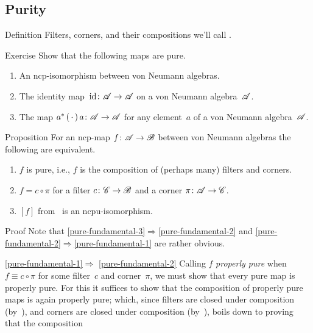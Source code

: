 \documentclass[a]{subfiles}
\begin{document}
\subsection{Purity}
\begin{parsec}%
\begin{point}[pure]{Definition}%
Filters, corners,
and their compositions we'll call .
\end{point}
\begin{point}{Exercise}%
Show that the following maps are pure.
\begin{enumerate}%
\item
An ncp-isomorphism between von Neumann algebras.
\item
The identity map~$\operatorname{id}\colon \mathscr{A}\to\mathscr{A}$
on a von Neumann algebra~$\mathscr{A}$.
\item
The map $a^*\,(\,\cdot\,)\,a\colon \mathscr{A}\to\mathscr{A}$
for any element~$a$ of a von Neumann algebra~$\mathscr{A}$.
\end{enumerate}
\end{point}
\begin{point}{Proposition}%
For an ncp-map $f\colon \mathscr{A}\to\mathscr{B}$ between von Neumann algebras
the following are equivalent.
\begin{enumerate}
\item 
\label{pure-fundamental-1}
	$f$ is pure, i.e., $f$ is the composition
	of (perhaps many) filters and corners.
\item
\label{pure-fundamental-2}
	$f = c\circ \pi$ for a filter $c\colon \mathscr{C}\to\mathscr{B}$
	and a corner $\pi\colon \mathscr{A}\to\mathscr{C}$.
\item
\label{pure-fundamental-3}
	$[f]$ from~ is an ncpu-isomorphism.
\end{enumerate}
\begin{point}{Proof}%
Note that \ref{pure-fundamental-3}$\Longrightarrow$\ref{pure-fundamental-2}
and \ref{pure-fundamental-2}$\Longrightarrow$\ref{pure-fundamental-1}
are rather obvious.
\begin{point}{\ref{pure-fundamental-1}$\Longrightarrow$%
\ref{pure-fundamental-2}}%
Calling $f$ \emph{properly pure}
when~$f\equiv c\circ \pi$
for some filter~$c$ and corner~$\pi$,
we must show that every pure map is properly pure.
For this it suffices to show that the composition of properly
pure maps is again properly pure;
which,
since filters are closed under composition
(by~),
and corners are closed under composition
(by~),
boils down to proving that the composition

\end{point}
\end{point}
\end{point}
\end{parsec}
\end{document}
